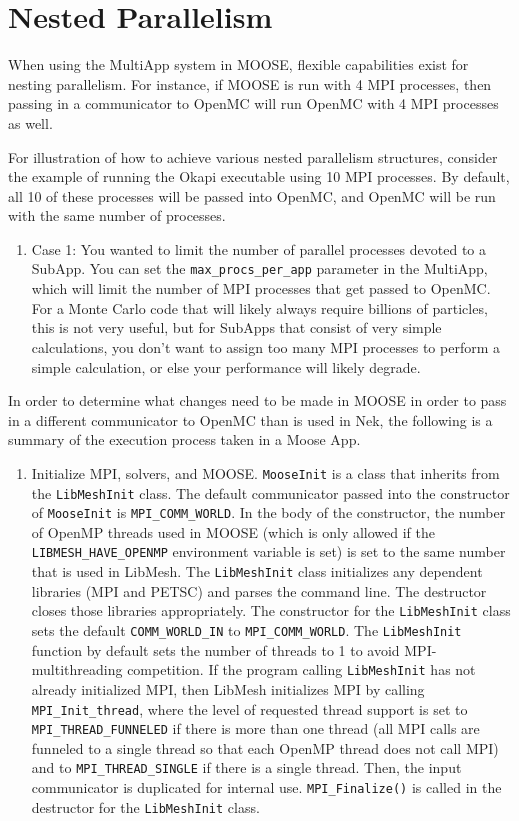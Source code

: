\documentclass[10pt]{article}
\numberwithin{equation}{section} %
\begin{document}
\clearpage
\section{Nested Parallelism}
When using the MultiApp system in MOOSE, flexible capabilities exist for nesting parallelism. For instance, if MOOSE is run with 4 MPI processes, then passing in a communicator to OpenMC will run OpenMC with 4 MPI processes as well. 

For illustration of how to achieve various nested parallelism structures, consider the example of running the Okapi executable using 10 MPI processes. By default, all 10 of these processes will be passed into OpenMC, and OpenMC will be run with the same number of processes. 

\begin{enumerate}
\item Case 1: You wanted to limit the number of parallel processes devoted to a SubApp. You can set the {\tt max\_procs\_per\_app} parameter in the MultiApp, which will limit the number of MPI processes that get passed to OpenMC. For a Monte Carlo code that will likely always require billions of particles, this is not very useful, but for SubApps that consist of very simple calculations, you don't want to assign too many MPI processes to perform a simple calculation, or else your performance will likely degrade.
\end{enumerate} 

In order to determine what changes need to be made in MOOSE in order to pass in a different communicator to OpenMC than is used in Nek, the following is a summary of the execution process taken in a Moose App. 

\begin{enumerate}
\item Initialize MPI, solvers, and MOOSE. {\tt MooseInit} is a class that inherits from the {\tt LibMeshInit} class. The default communicator passed into the constructor of {\tt MooseInit} is {\tt MPI\_COMM\_WORLD}. In the body of the constructor, the number of OpenMP threads used in MOOSE (which is only allowed if the {\tt LIBMESH\_HAVE\_OPENMP} environment variable is set) is set to the same number that is used in LibMesh. The {\tt LibMeshInit} class initializes any dependent libraries (MPI and PETSC) and parses the command line. The destructor closes those libraries appropriately. The constructor for the {\tt LibMeshInit} class sets the default {\tt COMM\_WORLD\_IN} to {\tt MPI\_COMM\_WORLD}. The {\tt LibMeshInit} function by default sets the number of threads to 1 to avoid MPI-multithreading competition. If the program calling {\tt LibMeshInit} has not already initialized MPI, then LibMesh initializes MPI by calling {\tt MPI\_Init\_thread}, where the level of requested thread support is set to {\tt MPI\_THREAD\_FUNNELED} if there is more than one thread (all MPI calls are funneled to a single thread so that each OpenMP thread does not call MPI) and to {\tt MPI\_THREAD\_SINGLE} if there is a single thread. Then, the input communicator is duplicated for internal use. {\tt MPI\_Finalize()} is called in the destructor for the {\tt LibMeshInit} class. 
\end{enumerate}
\end{document}
